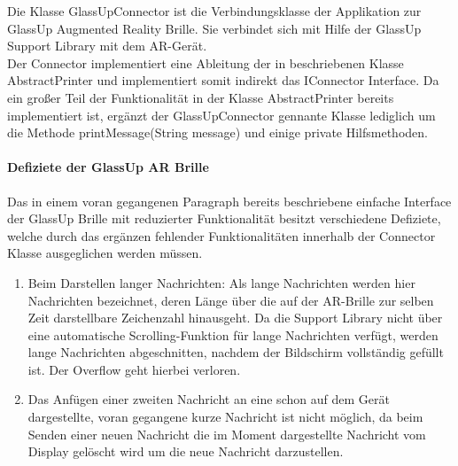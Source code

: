 Die Klasse GlassUpConnector ist die Verbindungsklasse der Applikation zur GlassUp Augmented Reality Brille. Sie verbindet sich mit Hilfe der GlassUp Support Library mit dem AR-Gerät.\\
Der Connector implementiert eine Ableitung der in  beschriebenen Klasse AbstractPrinter und implementiert somit indirekt das IConnector Interface. Da ein großer Teil der Funktionalität in der Klasse AbstractPrinter bereits implementiert ist, ergänzt der GlassUpConnector gennante Klasse lediglich um die Methode printMessage(String message) und einige private Hilfsmethoden.\\

\paragraph{Defiziete der GlassUp AR Brille}
Das in einem voran gegangenen Paragraph bereits beschriebene einfache Interface der GlassUp Brille mit reduzierter Funktionalität besitzt verschiedene Defiziete, welche durch das ergänzen fehlender Funktionalitäten innerhalb der Connector Klasse ausgeglichen werden müssen.
\begin{enumerate} 
	\item Beim Darstellen langer Nachrichten: Als lange Nachrichten werden hier Nachrichten bezeichnet, deren Länge über die auf der AR-Brille zur selben Zeit darstellbare Zeichenzahl hinausgeht. Da die Support Library nicht über eine automatische Scrolling-Funktion für lange Nachrichten verfügt, werden lange Nachrichten abgeschnitten, nachdem der Bildschirm vollständig gefüllt ist. Der Overflow geht hierbei verloren.
	\item Das Anfügen einer zweiten Nachricht an eine schon auf dem Gerät dargestellte, voran gegangene kurze Nachricht ist nicht möglich, da beim Senden einer neuen Nachricht die im Moment dargestellte Nachricht vom Display gelöscht wird um die neue Nachricht darzustellen.
\end{enumerate}

